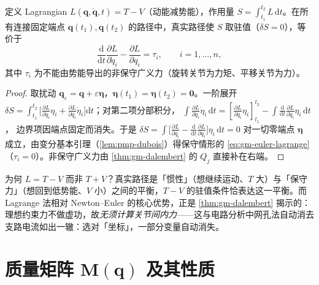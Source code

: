 \begin{theorem}\label{thm:gm-el}
定义 Lagrangian $L(\mathbf q,\dot{\mathbf q},t)=T-V$（动能减势能），作用量 $S=\int_{t_1}^{t_2}L\,\mathrm dt$。在所有连接固定端点 $\mathbf q(t_1),\mathbf q(t_2)$ 的路径中，真实路径使 $S$ 取驻值（$\delta S=0$），等价于
\begin{equation}
  \frac{\mathrm d}{\mathrm dt}\frac{\partial L}{\partial\dot q_i}-\frac{\partial L}{\partial q_i}=\tau_i,\qquad i=1,\dots,n,
  \label{eq:gm-euler-lagrange}
\end{equation}
其中 $\tau_i$ 为不能由势能导出的非保守广义力（旋转关节为力矩、平移关节为力）。
\end{theorem}

\begin{proof}
取扰动 $\mathbf q_\varepsilon=\mathbf q+\varepsilon\boldsymbol\eta$，$\boldsymbol\eta(t_1)=\boldsymbol\eta(t_2)=\mathbf 0$。一阶展开
$\delta S=\int_{t_1}^{t_2}\big[\tfrac{\partial L}{\partial q_i}\eta_i+\tfrac{\partial L}{\partial\dot q_i}\dot\eta_i\big]\mathrm dt$；对第二项分部积分，
$\int\tfrac{\partial L}{\partial\dot q_i}\dot\eta_i\,\mathrm dt=[\tfrac{\partial L}{\partial\dot q_i}\eta_i]_{t_1}^{t_2}-\int\tfrac{\mathrm d}{\mathrm dt}\tfrac{\partial L}{\partial\dot q_i}\eta_i\,\mathrm dt$，
边界项因端点固定而消失。于是 $\delta S=\int\big[\tfrac{\partial L}{\partial q_i}-\tfrac{\mathrm d}{\mathrm dt}\tfrac{\partial L}{\partial\dot q_i}\big]\eta_i\,\mathrm dt=0$ 对一切零端点 $\boldsymbol\eta$ 成立，由变分基本引理（\cref{lem:pmp-dubois}）得保守情形的 \cref{eq:gm-euler-lagrange}（$\tau_i=0$）。非保守广义力由 \cref{thm:gm-dalembert} 的 $Q_j$ 直接补在右端。
\end{proof}

\begin{insight}
为何 $L=T-V$ 而非 $T+V$？真实路径是「惯性」（想继续运动、$T$ 大）与「保守力」（想回到低势能、$V$ 小）之间的平衡，$T-V$ 的驻值条件恰表达这一平衡。而 Lagrange 法相对 Newton--Euler 的核心优势，正是 \cref{thm:gm-dalembert} 揭示的：理想约束力不做虚功，故\emph{无须计算关节间内力}——这与电路分析中网孔法自动消去支路电流如出一辙：选对「坐标」，一部分变量自动消失。
\end{insight}

\section{质量矩阵 \texorpdfstring{$\mathbf M(\mathbf q)$}{M(q)} 及其性质}
\label{sec:gm-massmatrix}

